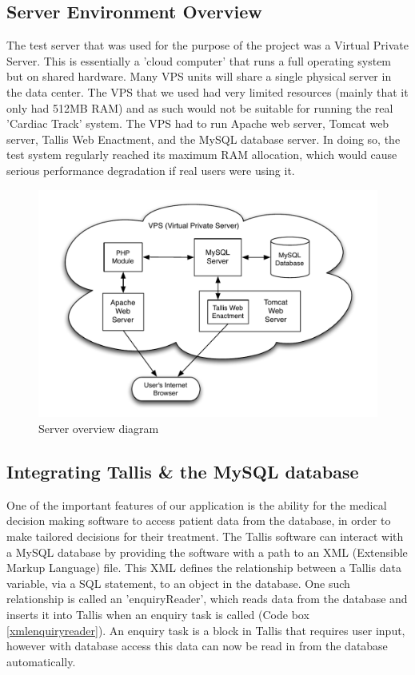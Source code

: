 \documentclass[11pt]{article}
\begin{document}
\subsection{Server Environment Overview} \label{vps}
The test server that was used for the purpose of the project was a Virtual Private Server. This is essentially a 'cloud computer' that runs a full operating system but on shared hardware. Many VPS units will share a single physical server in the data center. The VPS that we used had very limited resources (mainly that it only had 512MB RAM) and as such would not be suitable for running the real 'Cardiac Track' system. The VPS had to run Apache web server, Tomcat web server, Tallis Web Enactment, and the MySQL database server. In doing so, the test system regularly reached its maximum RAM allocation, which would cause serious performance degradation if real users were using it.

\begin{figure}[ht]
\centering
\includegraphics[scale=0.85]{server-environment-pdf-2}
\caption{Server overview diagram}
\label{server-environment}
\end{figure}


\subsection{Integrating Tallis \& the MySQL database}
One of the important features of our application is the ability for the medical decision making software to access patient data from the database, in order to make tailored decisions for their treatment. The Tallis software can interact with a MySQL database by providing the software with a path to an XML (Extensible Markup Language) file. This XML defines the relationship between a Tallis data variable, via a SQL statement, to an object in the database. One such relationship is called an 'enquiryReader', which reads data from the database and inserts it into Tallis when an enquiry task is called (Code box \ref{xmlenquiryreader}). An enquiry task is a block in Tallis that requires user input, however with database access this data can now be read in from the database automatically. 
\end{document}
